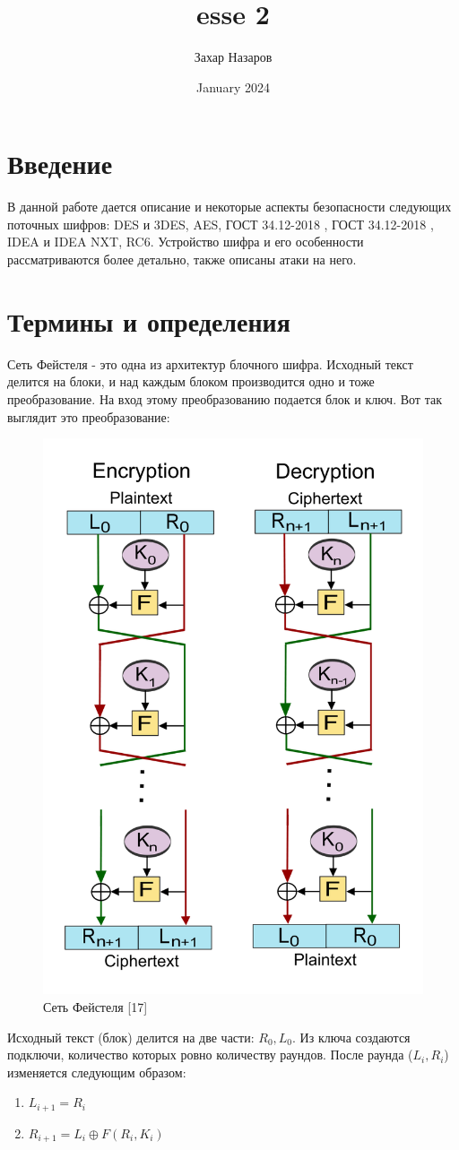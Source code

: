 \documentclass[colorthm]{./civarticle}
\title{esse 2}
\author{Захар Назаров}
\date{January 2024}
\begin{document}
\section{Введение}
В данной работе дается описание и некоторые аспекты безопасности следующих поточных шифров: DES и 3DES, AES, ГОСТ 34.12-2018 \textquotedbl, ГОСТ 34.12-2018 \textquotedbl, IDEA и IDEA NXT, RC6. Устройство шифра \textquotedbl и его особенности рассматриваются более детально, также описаны атаки на него.

\section{Термины и определения}

\begin{definition}
  Сеть Фейстеля - это одна из архитектур блочного шифра. Исходный текст делится на блоки, и над каждым блоком производится одно и тоже преобразование. На вход этому преобразованию подается блок и ключ. Вот так выглядит это преобразование: 

  \begin{figure}[H]
      \centering
      \includegraphics[width=0.5\linewidth]{800px-Feistel_cipher_diagram_en.svg.png}
      \caption{Сеть Фейстеля [17]}
      \label{fig:enter-label}
  \end{figure}

    Исходный текст (блок) делится на две части: $R_0, L_0$. Из ключа создаются подключи, количество которых ровно количеству раундов. После раунда ($L_i, R_i$) изменяется следующим образом:
    \begin{enumerate}
        \item $L_{i+1} = R_i$
        \item $R_{i+1} = L_i \oplus F(R_i, K_i)$
    \end{enumerate}


\end{definition}
\end{document}

